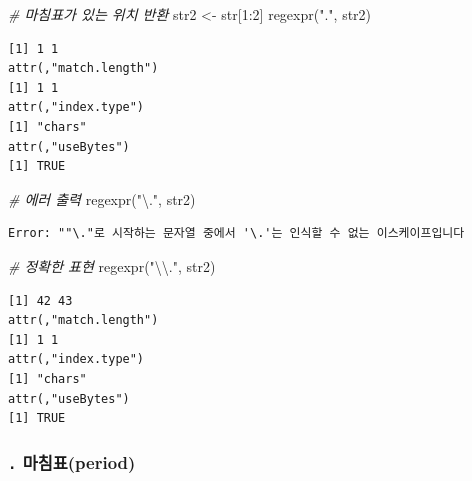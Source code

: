 \documentclass[
  11pt,
]{krantz}
\newenvironment{Shaded}{\begin{snugshade}}{\end{snugshade}}
\newcommand{\CommentTok}[1]{\textcolor[rgb]{0.37,0.37,0.37}{\textit{#1}}}
\newcommand{\DecValTok}[1]{\textcolor[rgb]{0.06,0.06,0.06}{#1}}
\newcommand{\FunctionTok}[1]{\textcolor[rgb]{0,0,0}{#1}}
\newcommand{\NormalTok}[1]{#1}
\newcommand{\OtherTok}[1]{\textcolor[rgb]{0.37,0.37,0.37}{#1}}
\newcommand{\SpecialCharTok}[1]{\textcolor[rgb]{0,0,0}{#1}}
\newcommand{\StringTok}[1]{\textcolor[rgb]{0.5,0.5,0.5}{#1}}
\begin{document}
\footnotesize

\begin{Shaded}
\begin{Highlighting}[]
\CommentTok{\# 마침표가 있는 위치 반환}
\NormalTok{str2 }\OtherTok{\textless{}{-}}\NormalTok{ str[}\DecValTok{1}\SpecialCharTok{:}\DecValTok{2}\NormalTok{]}
\FunctionTok{regexpr}\NormalTok{(}\StringTok{"."}\NormalTok{, str2)}
\end{Highlighting}
\end{Shaded}

\begin{verbatim}
[1] 1 1
attr(,"match.length")
[1] 1 1
attr(,"index.type")
[1] "chars"
attr(,"useBytes")
[1] TRUE
\end{verbatim}

\normalsize

\footnotesize

\begin{Shaded}
\begin{Highlighting}[]
\CommentTok{\# 에러 출력}
\FunctionTok{regexpr}\NormalTok{(}\StringTok{"\textbackslash{}."}\NormalTok{, str2)}
\end{Highlighting}
\end{Shaded}

\begin{verbatim}
Error: ""\."로 시작하는 문자열 중에서 '\.'는 인식할 수 없는 이스케이프입니다
\end{verbatim}

\normalsize

\footnotesize

\begin{Shaded}
\begin{Highlighting}[]
\CommentTok{\# 정확한 표현}
\FunctionTok{regexpr}\NormalTok{(}\StringTok{"}\SpecialCharTok{\textbackslash{}\textbackslash{}}\StringTok{."}\NormalTok{, str2)}
\end{Highlighting}
\end{Shaded}

\begin{verbatim}
[1] 42 43
attr(,"match.length")
[1] 1 1
attr(,"index.type")
[1] "chars"
attr(,"useBytes")
[1] TRUE
\end{verbatim}

\normalsize

\hypertarget{period}{%
\subsubsection*{\texorpdfstring{\textbf{\texttt{.} 마침표(period)}}{. 마침표(period)}}\label{period}}
\end{document}
